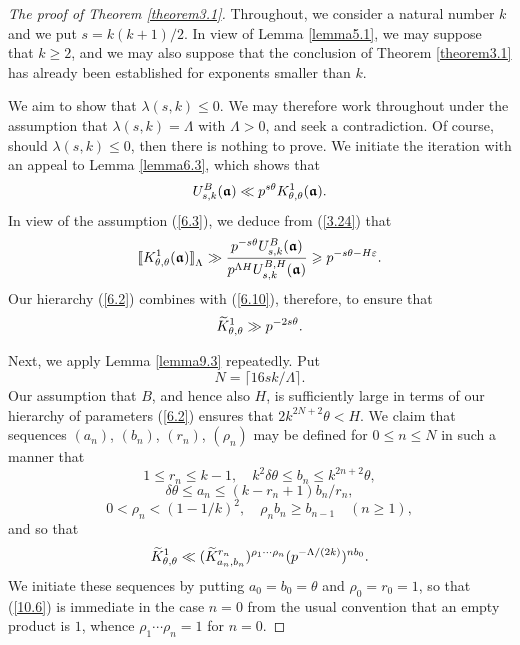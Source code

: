 \documentclass[12pt,reqno]{amsart}
\theoremstyle{definition}
\theoremstyle{remark}
\numberwithin{equation}{section}
\def\del{{\delta}} \def\Del{{\Delta}} \def\Deltil{{\widetilde \Delta}}
\def\tet{{\theta}} \def\bftet{{\boldsymbol \theta}}
\def\lam{{\lambda}} \def\Lam{{\Lambda}} \def\Lamtil{{\widetilde \Lambda}}
\def\eps{\varepsilon}
\def\le{\leqslant} \def\ge{\geqslant} \def\pleq{\preccurlyeq} \def\ple{\prec}
\newcommand{\rrbracketsub}[1]{\rrbracket_{\textstyle{_#1}}}
\begin{document}
\begin{proof}[The proof of Theorem \ref{theorem3.1}] Throughout, we consider a 
natural number $k$ and we put $s=k(k+1)/2$. In view of Lemma \ref{lemma5.1}, we may 
suppose that $k\ge 2$, and we may also suppose that the conclusion of Theorem 
\ref{theorem3.1} has already been established for exponents smaller than $k$.\par

We aim to show that $\lam(s,k)\le 0$. We may 
therefore work throughout under the assumption that $\lam(s,k)=\Lam$ with $\Lam>0$, 
and seek a contradiction. Of course, should $\lam(s,k)\le 0$, then there is nothing to prove. 
We initiate the iteration with an appeal to Lemma \ref{lemma6.3}, which shows that
$$U_{s,k}^B(\bfgra)\ll p^{s\tet}K_{\tet,\tet}^1(\bfgra).$$
In view of the assumption (\ref{6.3}), we deduce from (\ref{3.24}) that
$$\llbracket K_{\tet,\tet}^1(\bfgra)\rrbracketsub{\Lam}\gg 
\frac{p^{-s\tet}U_{s,k}^B(\bfgra)}{p^{\Lam H}U_{s,k}^{B,H}(\bfgra)}\ge 
p^{-s\tet-H\eps}.$$
Our hierarchy (\ref{6.2}) combines with (\ref{6.10}), therefore, to ensure that
\begin{equation}\label{10.1}
\Ktil_{\tet,\tet}^1\gg p^{-2s\tet}.
\end{equation}

\par Next, we apply Lemma \ref{lemma9.3} repeatedly. Put
\begin{equation}\label{10.2}
N=\lceil 16sk/\Lam\rceil .
\end{equation}
Our assumption that $B$, and hence also $H$, is sufficiently large in terms of our 
hierarchy of parameters (\ref{6.2}) ensures that $2k^{2N+2}\tet<H$. We claim that 
sequences $(a_n)$, $(b_n)$, $(r_n)$, $(\rho_n)$ may be defined for $0\le n\le N$ in 
such a manner that
\begin{equation}\label{10.3}
1\le r_n\le k-1,\quad k^2\del\tet \le b_n\le k^{2n+2}\tet ,
\end{equation}
\begin{equation}\label{10.4}
\del \tet \le a_n\le (k-r_n+1)b_n/r_n,
\end{equation}
\begin{equation}\label{10.5}
0<\rho_n<(1-1/k)^2,\quad \rho_nb_n\ge b_{n-1}\quad (n\ge 1),
\end{equation}
and so that
\begin{equation}\label{10.6}
\Ktil_{\tet,\tet}^1\ll (\Ktil_{a_n,b_n}^{r_n})^{\rho_1\cdots \rho_n}
(p^{-\Lam/(2k)})^{nb_0}.
\end{equation}
We initiate these sequences by putting $a_0=b_0=\tet$ and $\rho_0=r_0=1$, so that 
(\ref{10.6}) is immediate in the case $n=0$ from the usual convention that an empty 
product is $1$, whence $\rho_1\cdots \rho_n=1$ for $n=0$.\par


\end{proof}
\end{document}
